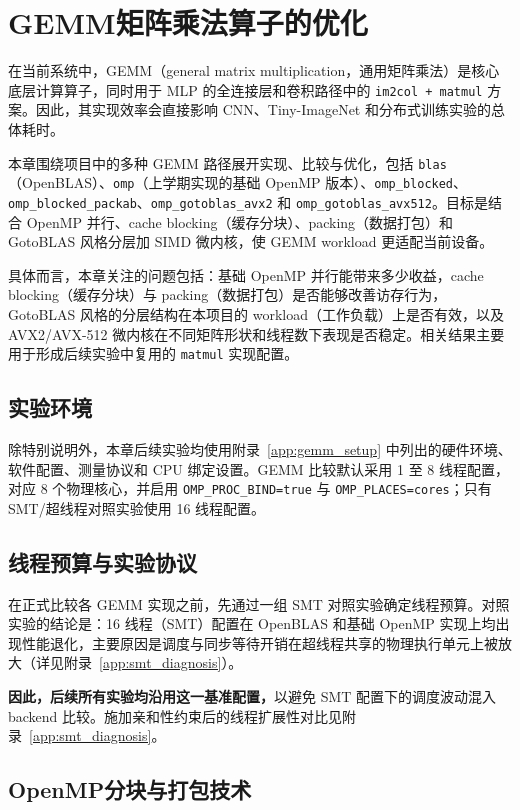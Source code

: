 \documentclass[a4paper,11pt,oneside]{article}
\begin{document}
\section{GEMM矩阵乘法算子的优化}

在当前系统中，GEMM（general matrix multiplication，通用矩阵乘法）是核心底层计算算子，同时用于 MLP 的全连接层和卷积路径中的 \texttt{im2col + matmul} 方案。因此，其实现效率会直接影响 CNN、Tiny-ImageNet 和分布式训练实验的总体耗时。

本章围绕项目中的多种 GEMM 路径展开实现、比较与优化，包括 \texttt{blas}（OpenBLAS）、\texttt{omp}（上学期实现的基础 OpenMP 版本）、\texttt{omp\_blocked}、\texttt{omp\_blocked\_packab}、\texttt{omp\_gotoblas\_avx2} 和 \texttt{omp\_gotoblas\_avx512}。目标是结合 OpenMP 并行、cache blocking（缓存分块）、packing（数据打包）和 GotoBLAS 风格分层加 SIMD 微内核，使 GEMM workload 更适配当前设备。

具体而言，本章关注的问题包括：基础 OpenMP 并行能带来多少收益，cache blocking（缓存分块）与 packing（数据打包）是否能够改善访存行为，GotoBLAS 风格的分层结构在本项目的 workload（工作负载）上是否有效，以及 AVX2/AVX-512 微内核在不同矩阵形状和线程数下表现是否稳定。相关结果主要用于形成后续实验中复用的 \texttt{matmul} 实现配置。

\subsection{实验环境}
除特别说明外，本章后续实验均使用附录~\ref{app:gemm_setup} 中列出的硬件环境、软件配置、测量协议和 CPU 绑定设置。GEMM 比较默认采用 1 至 8 线程配置，对应 8 个物理核心，并启用 \texttt{OMP\_PROC\_BIND=true} 与 \texttt{OMP\_PLACES=cores}；只有 SMT/超线程对照实验使用 16 线程配置。

\subsection{线程预算与实验协议}\label{sec:gemm_smt}

在正式比较各 GEMM 实现之前，先通过一组 SMT 对照实验确定线程预算。对照实验的结论是：16 线程（SMT）配置在 OpenBLAS 和基础 OpenMP 实现上均出现性能退化，主要原因是调度与同步等待开销在超线程共享的物理执行单元上被放大（详见附录~\ref{app:smt_diagnosis}）。

\textbf{因此，后续所有实验均沿用这一基准配置，}以避免 SMT 配置下的调度波动混入 backend 比较。施加亲和性约束后的线程扩展性对比见附录~\ref{app:smt_diagnosis}。

\subsection{OpenMP分块与打包技术}
\end{document}
